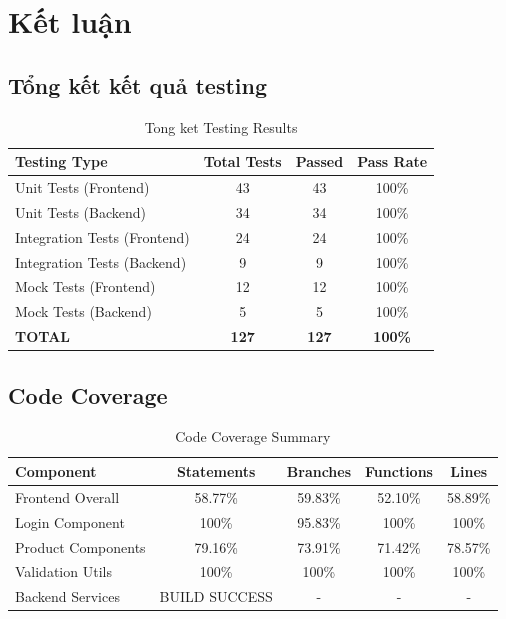 \section{Kết luận}

\subsection{Tổng kết kết quả testing}

\begin{table}[H]
\centering
\begin{tabular}{|l|c|c|c|}
\hline
\textbf{Testing Type} & \textbf{Total Tests} & \textbf{Passed} & \textbf{Pass Rate} \\
\hline
Unit Tests (Frontend) & 43 & 43 & 100\% \\
\hline
Unit Tests (Backend) & 34 & 34 & 100\% \\
\hline
Integration Tests (Frontend) & 24 & 24 & 100\% \\
\hline
Integration Tests (Backend) & 9 & 9 & 100\% \\
\hline
Mock Tests (Frontend) & 12 & 12 & 100\% \\
\hline
Mock Tests (Backend) & 5 & 5 & 100\% \\
\hline
\textbf{TOTAL} & \textbf{127} & \textbf{127} & \textbf{100\%} \\
\hline
\end{tabular}
\caption{Tong ket Testing Results}
\end{table}

\subsection{Code Coverage}

\begin{table}[H]
\centering
\begin{tabular}{|l|c|c|c|c|}
\hline
\textbf{Component} & \textbf{Statements} & \textbf{Branches} & \textbf{Functions} & \textbf{Lines} \\
\hline
Frontend Overall & 58.77\% & 59.83\% & 52.10\% & 58.89\% \\
\hline
Login Component & 100\% & 95.83\% & 100\% & 100\% \\
\hline
Product Components & 79.16\% & 73.91\% & 71.42\% & 78.57\% \\
\hline
Validation Utils & 100\% & 100\% & 100\% & 100\% \\
\hline
Backend Services & BUILD SUCCESS & - & - & - \\
\hline
\end{tabular}
\caption{Code Coverage Summary}
\end{table}

